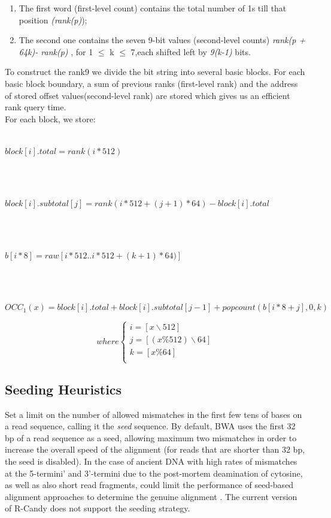 \documentclass[11pt,a4paper]{report}
\begin{document}
\begin{enumerate}

	\item The first word (first-level count) contains the total number of
	 1s till that position \emph{(rank(p)});
	
	\item The second one contains the seven 9-bit values (second-level counts)
	 \emph{rank(p + 64k)- rank(p)} , for 1 $\leq$ k $\leq$ 7,each shifted left by \emph{9(k-1)} bits.
	
\end{enumerate}

To construct the rank9  we divide the bit string into several basic blocks.
For each basic block boundary, a sum of previous ranks (first-level rank) and the address of  
stored offset values(second-level rank) are stored which gives us an efficient rank query time. \\

For each block, we store:\\\\
\centerline{$ block[i].total= rank(i*512)$}\\\\
\centerline{$ block[i].subtotal[j]= rank(i*512 + (j+1)*64)-block[i].total$}\\\\
\centerline{$ b[i*8]=raw[i*512..i*512+(k+1)*64)] $}\\\\
\centerline{$ OCC_{1}(x)=block[i].total+block[i].subtotal[j-1]+popcount(b[i*8 + j],0,k)$}



\[ where
\begin{cases}
	i=[ x \backslash 512 ]\\
	j=[(x \% 512 )\backslash 64 ]\\
	k=[ x \% 64  ]\\
\end{cases}
\]


\subsection{Seeding Heuristics}

Set a limit on the number of allowed mismatches in the first few tens of bases
on a read sequence, calling it the \emph{seed} sequence.
By default, BWA uses the first 32 bp of a read sequence as a seed, allowing 
maximum two mismatches in order to increase the overall speed of the alignment 
(for reads that are shorter than 32 bp, the seed is disabled)\cite{bwa}. 
In the case of ancient DNA with high rates of mismatches at the 5-termini' and 
3'-termini due to the post-mortem deamination of cytosine, as well as also short 
read fragments, could limit the performance of seed-based alignment approaches 
to determine the genuine alignment .
The current version of R-Candy does not support the seeding strategy.
\end{document}
